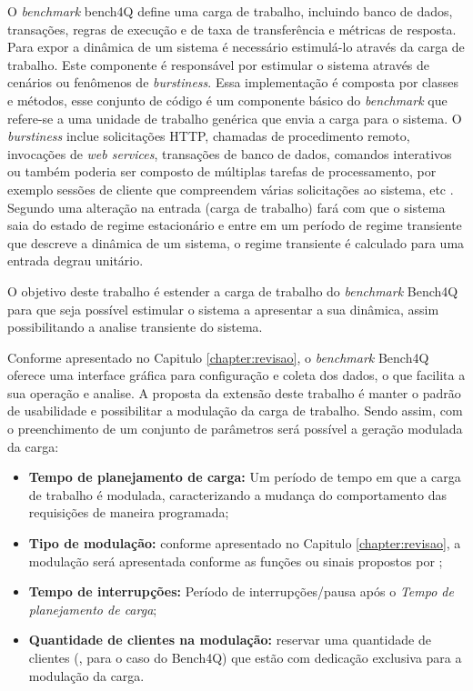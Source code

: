 O \textit{benchmark} bench4Q define uma carga de trabalho, incluindo banco de dados, transações, regras de execução e de taxa de transferência e métricas de resposta.  Para expor a dinâmica de um sistema é necessário estimulá-lo através da carga de trabalho. Este componente é responsável por estimular o sistema através de cenários ou fenômenos de \textit{burstiness}. Essa implementação é composta por classes e métodos, esse conjunto de código é um componente básico do \textit{benchmark} que refere-se a uma unidade de trabalho genérica que envia a carga para o sistema. O \textit{burstiness} inclue solicitações HTTP, chamadas de procedimento remoto, invocações de \textit{web services}, transações de banco de dados, comandos interativos ou também poderia ser composto de múltiplas tarefas de processamento, por exemplo sessões de cliente que compreendem várias solicitações ao sistema, etc \cite{Kounev2005}. Segundo  uma alteração na entrada (carga de trabalho) fará com que o sistema saia do estado de regime estacionário e entre em um período de regime transiente que descreve a dinâmica de um sistema, o regime transiente é calculado para uma entrada degrau unitário.

O objetivo deste trabalho é estender a carga de trabalho do \textit{benchmark} Bench4Q para que seja possível estimular o sistema a apresentar a sua dinâmica, assim possibilitando a analise transiente do sistema. 

Conforme apresentado no Capitulo \ref{chapter:revisao}, o \textit{benchmark} Bench4Q oferece uma interface gráfica para configuração e coleta dos dados, o que facilita a sua operação e analise. A proposta da extensão deste trabalho é manter o padrão de usabilidade e possibilitar a modulação da carga de trabalho. Sendo assim, com o preenchimento de um conjunto de parâmetros será possível a geração modulada da carga:
\begin{itemize}
	\item \textbf{Tempo de planejamento de carga:} Um período de tempo em que a carga de trabalho é modulada, caracterizando a mudança do comportamento das requisições de maneira programada;
	
	\item \textbf{Tipo de modulação:} conforme apresentado no Capitulo \ref{chapter:revisao}, a modulação será apresentada conforme as funções ou sinais propostos por ;
	
	\item \textbf{Tempo de interrupções:} Período de interrupções/pausa após o \textit{Tempo de planejamento de carga};
	
	\item \textbf{Quantidade de clientes na modulação:} reservar uma quantidade de clientes (, para o caso do Bench4Q) que estão com dedicação exclusiva para a modulação da carga.
\end{itemize}

